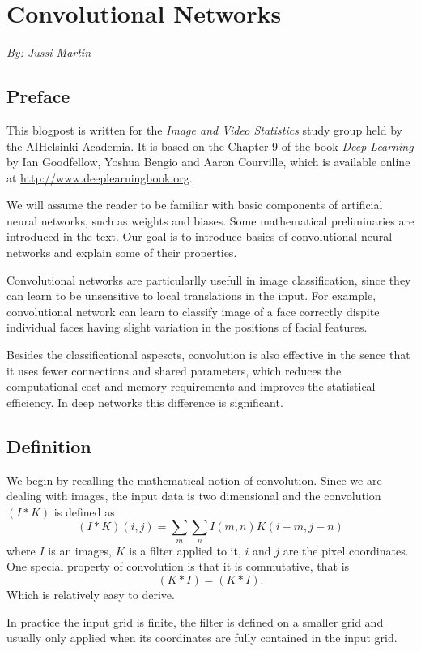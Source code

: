 \documentclass[]{article}
\begin{document}
\section{Convolutional Networks}
\begin{center}
  \emph{By: Jussi Martin}
\end{center}
\subsection{Preface}
This blogpost is written for the \emph{Image and Video Statistics} study group
held by the AIHelsinki Academia. It is based on the Chapter 9 of the book
\emph{Deep Learning} by Ian Goodfellow, Yoshua Bengio and Aaron Courville, which
is available online at \url{http://www.deeplearningbook.org}.

We will assume the reader to be familiar with basic components of artificial
neural networks, such as weights and biases. Some mathematical preliminaries are
introduced in the text. Our goal is to introduce basics of convolutional neural
networks and explain some of their properties.

Convolutional networks are particularlly usefull in image classification, since
they can learn to be unsensitive to local translations in the input. For example,
convolutional network can learn to classify image of a face correctly dispite
individual faces having slight variation in the positions of facial features.

Besides the classificational aspescts, convolution is also effective in the sence
that it uses fewer connections and shared parameters, which reduces the
computational cost and memory requirements and improves the statistical efficiency.
In deep networks this difference is significant.

\subsection{Definition}
We begin by recalling the mathematical notion of convolution.
Since we are dealing with images, the input data is two dimensional and the convolution
$(I * K)$ is defined as
\[
(I * K)(i, j) = \sum_m \sum_n I(m , n) K(i - m, j - n)
\]
where $I$ is an images, $K$ is a filter applied to it, $i$ and $j$ are the
pixel coordinates. One special property of convolution is that it is commutative, that is
\[
 (K * I) = (K * I).
\]
Which is relatively easy to derive.

In practice the input grid is finite, the filter is defined on a smaller grid and
usually only applied when its coordinates are fully contained in the input grid.
\end{document}
